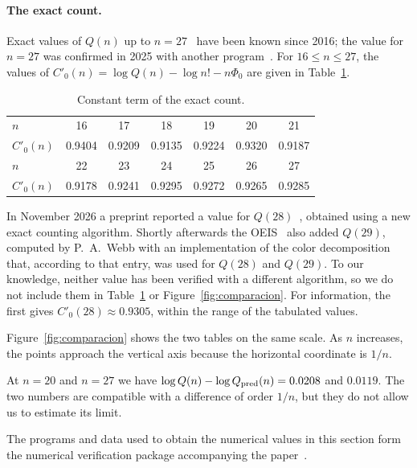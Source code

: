 \paragraph{The exact count.}
Exact values of $Q(n)$ up to $n=27$~\cite{OEIS,PE} have been known since 2016; the value for $n=27$ was
confirmed in 2025 with another program~\cite{YaoLi}. For $16\le n\le27$, the values of $C'_0(n)=\log
Q(n)-\log n!-n\Phi_0$ are given in Table~\ref{tab:exacto}.

\begin{table}[ht]
\centering
\begin{tabular}{lcccccc}
\toprule
$n$ & 16 & 17 & 18 & 19 & 20 & 21\\
$C'_0(n)$ & 0.9404 & 0.9209 & 0.9135 & 0.9224 & 0.9320 & 0.9187\\
\midrule
$n$ & 22 & 23 & 24 & 25 & 26 & 27\\
$C'_0(n)$ & 0.9178 & 0.9241 & 0.9295 & 0.9272 & 0.9265 & 0.9285\\
\bottomrule
\end{tabular}
\caption{Constant term of the exact count.}\label{tab:exacto}
\end{table}

In November 2026 a preprint reported a value for $Q(28)$~\cite{Cherepanov},
obtained using a new exact counting algorithm. Shortly afterwards the OEIS~\cite{OEIS} also added
$Q(29)$, computed by P.~A.~Webb with an implementation of the color decomposition that, according to
that entry, was used for $Q(28)$ and $Q(29)$. To our knowledge, neither value has been
verified with a different algorithm, so we do not include them in Table~\ref{tab:exacto} or
Figure~\ref{fig:comparacion}. For information, the first gives $C'_0(28)\approx0.9305$, within
the range of the tabulated values.

Figure~\ref{fig:comparacion} shows the two tables on the same scale.
As $n$ increases, the points approach the vertical axis because the horizontal coordinate is $1/n$.



At $n=20$ and $n=27$ we have $\log Q(n)-\log Q_{\rm pred}(n)=0.0208$ and $0.0119$. The two numbers
are compatible with a difference of order $1/n$, but they do not allow us to estimate its limit.

The programs and data used to obtain the numerical values in this section form the numerical verification
package
accompanying the paper~\cite{Codigo}.
